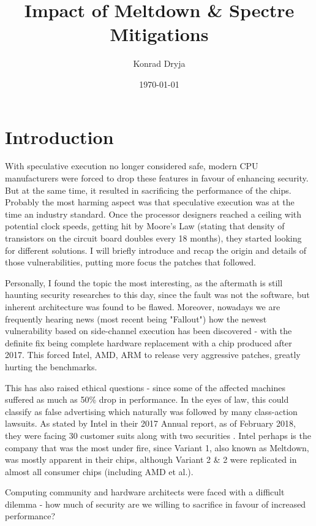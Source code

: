 \documentclass{csfourzero}
\title{Impact of Meltdown \& Spectre Mitigations}
\author{Konrad Dryja}
\date{\today}
\begin{document}
\maketitle


\section{Introduction}
\label{sec:intro}
With speculative execution no longer considered safe, modern CPU manufacturers were forced to drop these features in favour of enhancing security. But at the same time, it resulted in sacrificing the performance of the chips. Probably the most harming aspect was that speculative execution was at the time an industry standard. Once the processor designers reached a ceiling with potential clock speeds, getting hit by Moore's Law \cite{schaller1997moore} (stating that density of transistors on the circuit board doubles every 18 months), they started looking for different solutions. I will briefly introduce and recap the origin and details of those vulnerabilities, putting more focus the patches that followed.  

Personally, I found the topic the most interesting, as the aftermath is still haunting security researches to this day, since the fault was not the software, but inherent architecture was found to be flawed. Moreover, nowadays we are frequently hearing news (most recent being "Fallout"\cite{fallout}) how the newest vulnerability based on side-channel execution has been discovered - with the definite fix being complete hardware replacement with a chip produced after 2017. This forced Intel, AMD, ARM to release very aggressive patches, greatly hurting the benchmarks.

This has also raised ethical questions - since some of the affected machines suffered as much as 50\% drop in performance. In the eyes of law, this could classify as false advertising which naturally was followed by many class-action lawsuits. As stated by Intel in their 2017 Annual report, as of February 2018, they were facing 30 customer suits along with two securities \cite{intelreport}. Intel perhaps is the company that was the most under fire, since Variant 1, also known as Meltdown, was mostly apparent in their chips, although Variant 2 \& 2 were replicated in almost all consumer chips (including AMD et al.).

Computing community and hardware architects were faced with a difficult dilemma - how much of security are we willing to sacrifice in favour of increased performance?
\end{document}
